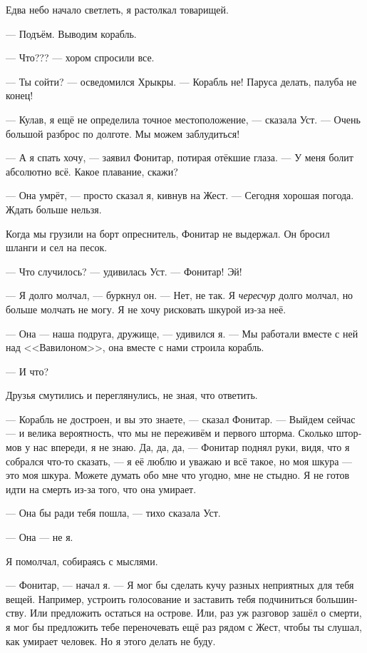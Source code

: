 \documentclass[a4paper,12pt,fleqn]{book}\usepackage{polyglossia}\setdefaultlanguage[babelshorthands=true]{russian}\setotherlanguage{english}\defaultfontfeatures{Ligatures=TeX,Mapping=tex-text}
\newcommand{\asterism}{\vspace{1em}{\centering\Large\bfseries$\ast~\ast~\ast$\par}\vspace{1em}}
\begin{document}
Едва небо начало светлеть, я растолкал товарищей.

--- Подъём.
Выводим корабль.

--- Что??? --- хором спросили все.

--- Ты сойти? --- осведомился Хрыкры.
--- Корабль не!
Паруса делать, палуба не конец!

--- Кулав, я ещё не определила точное местоположение, --- сказала Уст.
--- Очень большой разброс по долготе.
Мы можем заблудиться!

--- А я спать хочу, --- заявил Фонитар, потирая отёкшие глаза.
--- У меня болит абсолютно всё.
Какое плавание, скажи?

--- Она умрёт, --- просто сказал я, кивнув на Жест.
--- Сегодня хорошая погода.
Ждать больше нельзя.

\asterism

Когда мы грузили на борт опреснитель, Фонитар не выдержал.
Он бросил шланги и сел на песок.

--- Что случилось? --- удивилась Уст.
--- Фонитар!
Эй!

--- Я долго молчал, --- буркнул он.
--- Нет, не так.
Я \emph{чересчур} долго молчал, но больше молчать не могу.
Я не хочу рисковать шкурой из-за неё.

--- Она --- наша подруга, дружище, --- удивился я.
--- Мы работали вместе с ней над <<Вавилоном>>, она вместе с нами строила корабль.

--- И что?

Друзья смутились и переглянулись, не зная, что ответить.

--- Корабль не достроен, и вы это знаете, --- сказал Фонитар.
--- Выйдем сейчас --- и велика вероятность, что мы не переживём и первого шторма.
Сколько штормов у нас впереди, я не знаю.
Да, да, да, --- Фонитар поднял руки, видя, что я собрался что-то сказать, --- я её люблю и уважаю и всё такое, но моя шкура --- это моя шкура.
Можете думать обо мне что угодно, мне не стыдно.
Я не готов идти на смерть из-за того, что она умирает.

--- Она бы ради тебя пошла, --- тихо сказала Уст.

--- Она --- не я.

Я помолчал, собираясь с мыслями.

--- Фонитар, --- начал я.
--- Я мог бы сделать кучу разных неприятных для тебя вещей.
Например, устроить голосование и заставить тебя подчиниться большинству.
Или предложить остаться на острове.
Или, раз уж разговор зашёл о смерти, я мог бы предложить тебе переночевать ещё раз рядом с Жест, чтобы ты слушал, как умирает человек.
Но я этого делать не буду.
\end{document}
